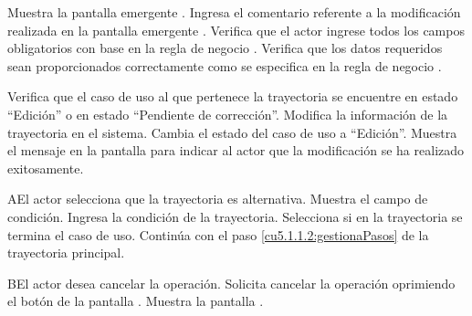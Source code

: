 \begin{UCtrayectoria}
	\UCpaso[\UCsist] Muestra la pantalla emergente .
	\UCpaso[\UCsist] Ingresa el comentario referente a la modificación realizada en la pantalla emergente . \label{cu5.1.1.2:ingresaComentario}
    \UCpaso[\UCsist] Verifica que el actor ingrese todos los campos obligatorios con base en la regla de negocio  . 
    \UCpaso[\UCsist] Verifica que los datos requeridos sean proporcionados correctamente como se especifica en la regla de negocio . 
	
	\UCpaso[\UCsist] Verifica que el caso de uso al que pertenece la trayectoria se encuentre en estado ``Edición'' o en estado ``Pendiente de corrección''.
	\UCpaso[\UCsist] Modifica la información de la trayectoria en el sistema.
    \UCpaso[\UCsist] Cambia el estado del caso de uso a ``Edición''.
	\UCpaso[\UCsist] Muestra el mensaje  en la pantalla  
	para indicar al actor que la modificación se ha realizado exitosamente.
    
\end{UCtrayectoria}
 \begin{UCtrayectoriaA}{A}{El actor selecciona que la trayectoria es alternativa.}
    \UCpaso[\UCsist] Muestra el campo de condición.
    \UCpaso[\UCactor] Ingresa la condición de la trayectoria.
    \UCpaso[\UCactor] Selecciona si en la trayectoria se termina el caso de uso.
    \UCpaso[] Continúa con el paso \ref{cu5.1.1.2:gestionaPasos} de la trayectoria principal.
 \end{UCtrayectoriaA}
 \begin{UCtrayectoriaA}{B}{El actor desea cancelar la operación.}
    \UCpaso[\UCactor] Solicita cancelar la operación oprimiendo el botón  de la pantalla .
    \UCpaso[\UCsist] Muestra la pantalla .
 \end{UCtrayectoriaA}
 
